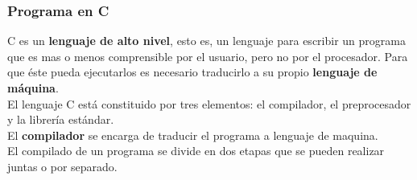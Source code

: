 \documentclass[letterpaper]{report}
\begin{document}
\subsubsection*{Programa en C}
C es un \textbf{lenguaje de alto nivel}, esto es, un lenguaje para escribir un programa que es mas o menos comprensible por el usuario, pero no por el procesador. Para que éste pueda ejecutarlos es necesario traducirlo a su propio \textbf{lenguaje de máquina}.\\
El lenguaje C está constituido por tres elementos: el compilador, el preprocesador y la librería estándar.\\El \textbf{compilador} se encarga de traducir el programa a lenguaje de maquina.\\
El compilado de un programa se divide en dos etapas que se pueden realizar juntas o por separado. \\
\end{document}
